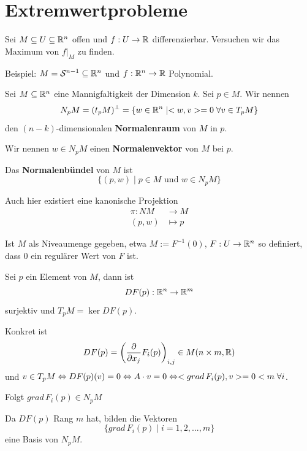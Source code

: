 \documentclass[main.tex]{subfiles}
\begin{document}
\section{Extremwertprobleme}

Sei $M \subseteq U \subseteq \mathbb{R}^n$ offen und $f: U \to \mathbb{R}$ differenzierbar. Versuchen wir das Maximum von $f|_M$ zu finden.

Beispiel: $M = \mathcal{S}^{n-1} \subseteq \mathbb{R}^n$ und $f: \mathbb{R}^n \to \mathbb{R}$ Polynomial.

\begin{Definition}[Normalenraum]
  Sei $M \subseteq \mathbb{R}^n$ eine Mannigfaltigkeit der Dimension $k$. Sei $p \in M$. Wir nennen
  $$N_p M = (t_p M)^\perp = \{w \in \mathbb{R}^n \mid <w,v> = 0 \;\forall v \in T_pM\}$$
  den $(n-k)$-dimensionalen \textbf{Normalenraum} von $M$ in $p$.

  Wir nennen $w \in N_p M$ einen \textbf{Normalenvektor} von $M$ bei $p$.

  Das \textbf{Normalenbündel} von $M$ ist
  $$\{(p,w) \mid p \in M \text{ und } w \in N_pM\}$$
\end{Definition}

\begin{Bemerkung}
  Auch hier existiert eine kanonische Projektion
  $$\begin{aligned}
    \pi : NM & \to M \\
    (p,w) & \mapsto p
  \end{aligned}$$
\end{Bemerkung}

\begin{Bemerkung}
  Ist $M$ als Niveaumenge gegeben, etwa $M := F^{-1}(0)$, $F: U \to \mathbb{R}^n$ so definiert, dass $0$ ein regulärer Wert von $F$ ist.

  Sei $p$ ein Element von $M$, dann ist
  $$DF(p): \mathbb{R}^n \to \mathbb{R}^m$$
  surjektiv und $T_pM = \ker DF(p)$.

  Konkret ist
  $$DF(p) = \left(\dfrac{\partial}{\partial x_j} F_i(p)\right)_{i,j} \in M(n \times m, \mathbb{R})$$
  und $v \in T_p M \Leftrightarrow DF(p)(v) = 0 \Leftrightarrow A \cdot v = 0 \Leftrightarrow <grad \, F_i(p),v> = 0 < m \;\forall i $.

  Folgt $grad \, F_i(p) \in N_p M$

  Da $DF(p)$ Rang $m$ hat, bilden die Vektoren
  $$\{grad \, F_i(p) \mid i = 1,2,...,m\}$$
  eine Basis von $N_p M$.
\end{Bemerkung}
\end{document}
